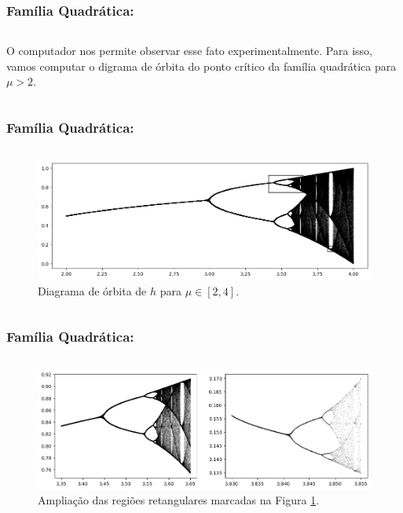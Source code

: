 
\begin{frame}
\vspace{5pt}
\frametitle{Família Quadrática: \subsecname}
\begin{columns}
\column{\dimexpr\paperwidth-15pt}

O computador nos permite observar esse fato experimentalmente.
Para isso, vamos computar o digrama de órbita do ponto crítico da família quadrática para $\mu > 2$.



\end{columns}
\end{frame}


\begin{frame}
\vspace{5pt}
\frametitle{Família Quadrática: \subsecname}
\begin{columns}
\column{\dimexpr\paperwidth-15pt}

\begin{figure}[!htb]
\centering
\includegraphics[scale=0.4]{images/period-doubling-and-zoom1.png}
\caption{Diagrama de órbita de $h$ para $\mu \in [2, 4]$.}
\label{period-doubling}
\end{figure}

\end{columns}
\end{frame}


\begin{frame}
\vspace{5pt}
\frametitle{Família Quadrática: \subsecname}
\begin{columns}
\column{\dimexpr\paperwidth-15pt}

\begin{figure}[H]
\centering
\includegraphics[scale=0.4]{images/period-doubling-and-zoom2.png}
\caption{Ampliação das regiões retangulares marcadas na Figura \ref{period-doubling}.}
\label{period-doubling1}
\end{figure}

\end{columns}
\end{frame}
